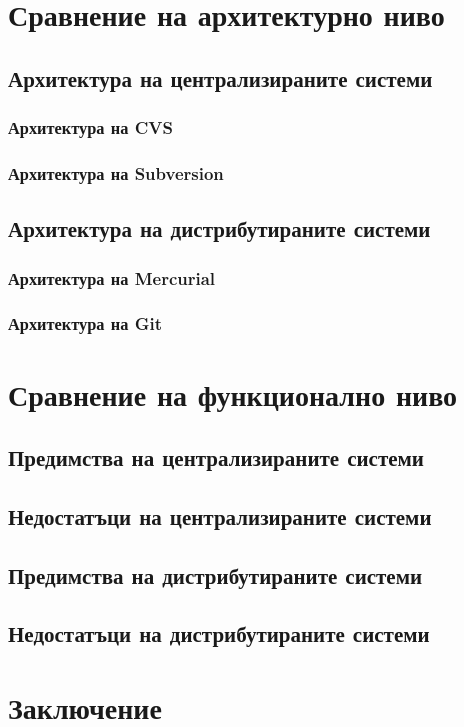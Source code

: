 \documentclass[a4paper]{article}
\begin{document}
\section{Сравнение на архитектурно ниво}
  \subsection{Архитектура на централизираните системи}
    \subsubsection{Архитектура на CVS}
    \subsubsection{Архитектура на Subversion}
  \subsection{Архитектура на дистрибутираните системи}
    \subsubsection{Архитектура на Mercurial}
    \subsubsection{Архитектура на Git}

\section{Сравнение на функционално ниво}
  \subsection{Предимства на централизираните системи}
  \subsection{Недостатъци на централизираните системи}
  \subsection{Предимства на дистрибутираните системи}
  \subsection{Недостатъци на дистрибутираните системи}

\section{Заключение}
\end{document}
